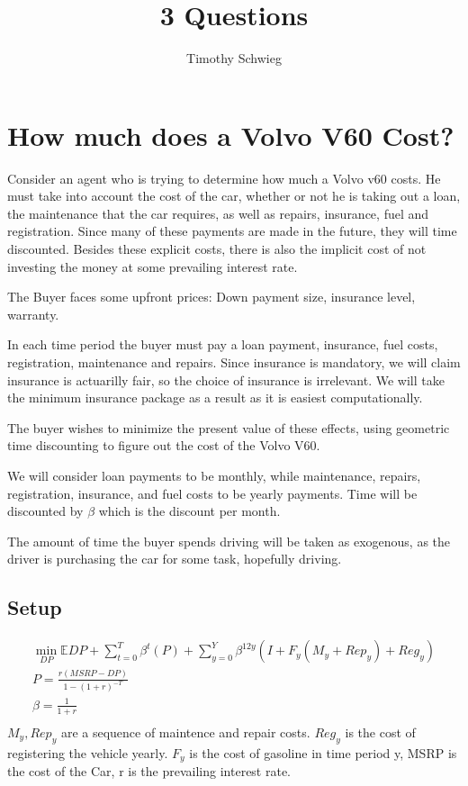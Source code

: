 \documentclass[10pt]{paper}
\title{3 Questions}
\author{Timothy Schwieg}
\begin{document}
\maketitle
\section{How much does a Volvo V60 Cost?}

Consider an agent who is trying to determine how much a Volvo v60
costs. He must take into account the cost of the car, whether or not
he is taking out a loan, the maintenance that the car requires, as well
as repairs, insurance, fuel and registration. Since many of these
payments are made in the future, they will time discounted. Besides
these explicit costs, there is also the implicit cost of not investing
the money at some prevailing interest rate.

The Buyer faces some upfront prices: Down payment size, insurance
level, warranty.

In each time period the buyer must pay a loan payment, insurance, fuel
costs, registration, maintenance and repairs. Since insurance is
mandatory, we will claim insurance is actuarilly fair, so the choice
of insurance is irrelevant. We will take the minimum insurance package
as a result as it is easiest computationally. 

The buyer wishes to minimize the present value of these effects, using
geometric time discounting to figure out the cost of the Volvo V60.

We will consider loan payments to be monthly,
while maintenance, repairs, registration, insurance, and fuel costs to be yearly
payments. Time will be discounted by $\beta$ which is the discount per
month.

The amount of time the buyer spends driving will be taken as
exogenous, as the driver is purchasing the car for some task,
hopefully driving.

\subsection*{Setup}
\begin{align*}
  \min_{DP} \mathbb{E} DP  + \sum_{t=0}^T \beta^t (P) +
  \sum_{y=0}^Y \beta^{12y}(I + F_y (M_y + Rep_y) + Reg_y )\\
  P = \frac{r( MSRP - DP )}{1- (1+r)^{-T}}\\
  \beta = \frac{1}{1+r}\\ 
\end{align*}
$M_y, Rep_y$  are a sequence of maintence and repair costs.
$Reg_y$ is the cost of registering the vehicle yearly.
$F_y$ is the cost of gasoline in time period y, MSRP is the cost of
the Car, r is the prevailing interest rate.
\end{document}
